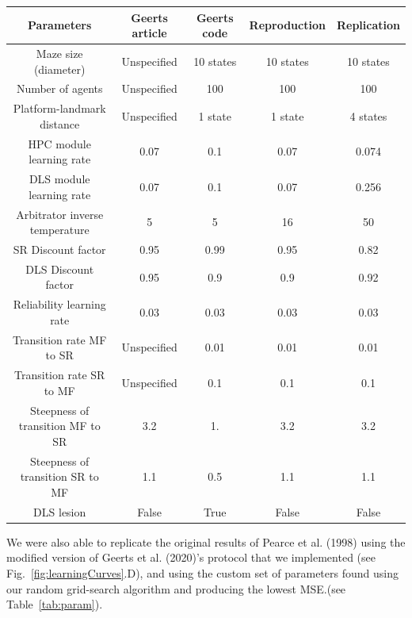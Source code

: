 \begin{center}
\hspace*{-1cm}
\begin{tabular}{ |c|c|c|c|c| }

\hline
Parameters & Geerts article & Geerts code & Reproduction & Replication \\ [0.5ex] 
\hline\hline
Maze size (diameter) & Unspecified  & 10 states & 10 states  & 10 states\\ 
Number of agents & Unspecified & 100 & 100 & 100\\ 
Platform-landmark distance & Unspecified & 1 state & 1 state & 4 states\\ 
HPC module learning rate & 0.07 & 0.1 & 0.07 & 0.074\\
DLS module learning rate & 0.07 & 0.1 & 0.07 & 0.256\\
Arbitrator inverse temperature & 5 & 5 & 16 & 50\\
SR Discount factor & 0.95 & 0.99 & 0.95 & 0.82 \\
DLS Discount factor & 0.95 & 0.9 & 0.9 & 0.92 \\
Reliability learning rate & 0.03 & 0.03 & 0.03 & 0.03 \\
Transition rate MF to SR & Unspecified & 0.01 & 0.01 & 0.01 \\
Transition rate SR to MF & Unspecified & 0.1 & 0.1 & 0.1\\
Steepness of transition MF to SR & 3.2 & 1. & 3.2 & 3.2\\
Steepness of transition SR to MF & 1.1 & 0.5 & 1.1 & 1.1\\
DLS lesion & False & True & False & False\\
\hline

\end{tabular}
\label{tab:param}
\end{center}

We were also able to replicate the original results of Pearce et al. (1998) \cite{Pearce:1998} using the modified version of Geerts et al. (2020)'s protocol that we implemented (see Fig.~\ref{fig:learningCurves}.D), and using the custom set of parameters found using our random grid-search algorithm and producing the lowest MSE.(see Table~\ref{tab:param}).

